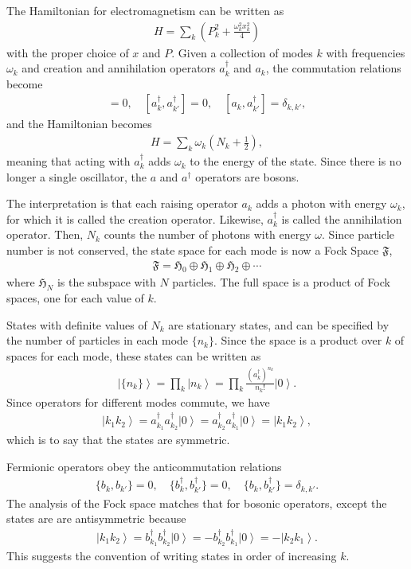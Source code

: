 \documentclass[12pt]{article} %
\renewcommand{\th}[1]{\frac{1}{#1}}
\newcommand{\om}{\omega}
\newcommand{\ket}[1]{\left|#1\right\rangle}
\begin{document}
The Hamiltonian for electromagnetism can be written as
\begin{align}
H = \sum_k \left(P_k^2 + \frac{\om_k^2x_k^2}{4}\right)
\end{align}
with the proper choice of $x$ and $P$. Given a collection of modes $k$ with frequencies $\om_k$ and creation and annihilation operators $a_k^\dag$ and $a_k$, the commutation relations become 
\begin{align}
[a_k, a_{k'}] = 0,\quad [a^\dag_k, a^\dag_{k'}]=0, \quad[a_k,a^\dag_{k'}] = 
	\delta_{k,k'},
\end{align}
and the Hamiltonian becomes
\begin{align}
H = \sum_k\om_k\left(N_k+\th{2}\right),
\end{align}
meaning that acting with $a_k^\dag$ adds $\om_k$ to the energy of the state. Since there is no longer a single oscillator, the $a$ and $a^\dag$ operators are bosons. 

The interpretation is that each raising operator $a_k$ adds a photon with energy $\om_k$, for which it is called the creation operator. Likewise, $a_k^\dag$ is called the annihilation operator. Then, $N_k$ counts the number of photons with energy $\om$. Since particle number is not conserved, the state space for each mode is now a  Fock Space $\mathfrak{F}$,
\begin{align}
\mathfrak{F} = \mathfrak{H}_0 \oplus \mathfrak{H}_1 \oplus \mathfrak{H}_2 
\oplus \cdots
\end{align}
where $\mathfrak{H}_N$ is the subspace with $N$ particles. The full space is a product of Fock spaces, one for each value of $k$.

States with definite values of $N_k$ are stationary states, and can be specified by the number of particles in each mode $\{n_k\}$. Since the space is a product over $k$ of spaces for each mode, these states can be written as
\begin{align}
\ket{\{n_k\}} = \prod_k\ket{n_k} = \prod_k\frac{(a_k^\dag)^{n_k}}{n_k!}\ket{0}.
\end{align}
Since operators for different modes commute, we have
\begin{align}
\ket{k_1k_2} = a^\dag_{k_1}a^\dag_{k_2}\ket{0} = a^\dag_{k_2} a^\dag_{k_1} \ket{0} = \ket{k_1k_2},
\end{align}
which is to say that the states are symmetric.

Fermionic operators obey the anticommutation relations
\begin{align}
\{b_k, b_{k'}\} = 0,\quad \{b^\dag_k, b^\dag_{k'}\} = 0,\quad \{b_k, b^\dag_{k'}\} = \delta_{k,k'}.
\end{align}
The analysis of the Fock space matches that for bosonic operators, except the states are are antisymmetric because
\begin{align}
\ket{k_1k_2} = b^\dag_{k_1}b^\dag_{k_2}\ket{0} = -b^\dag_{k_2}b^\dag_{k_1} 
	\ket{0} = -\ket{k_2k_1}.
\end{align}
This suggests the convention of writing states in order of increasing $k$.
\end{document}
